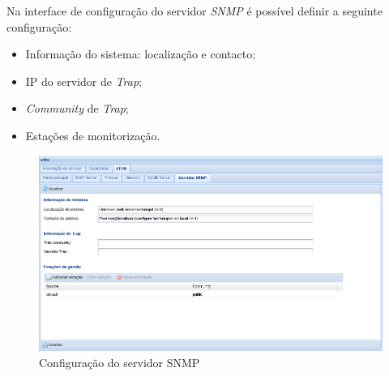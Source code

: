 Na interface de configuração do servidor \textit{SNMP} é possível definir a seguinte configuração:

\begin{itemize}
    \item Informação do sistema: localização e contacto;
    \item IP do servidor de \textit{Trap};
    \item \textit{Community} de \textit{Trap};
    \item Estações de monitorização.
\end{itemize}

\begin{figure}[H]
    \begin{center}
    \includegraphics[scale=0.38]{screenshots/etfw/etfw_snmp_01.png}
    \caption{Configuração do servidor SNMP}
    \label{fig:etfw_smp_01}
    \end{center}
\end{figure}

